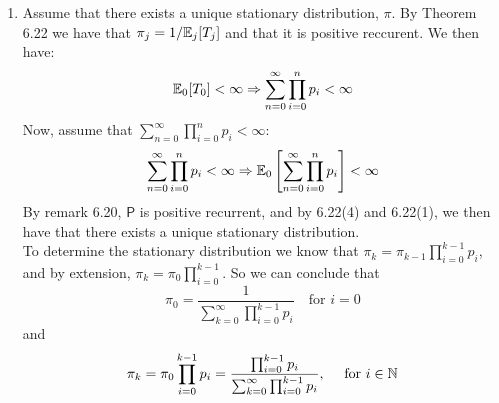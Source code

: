 \documentclass{Class}
\begin{document}
\begin{enumerate}
    \item 
    Assume that there exists a unique stationary distribution, $\pi$. By Theorem 6.22 we have that $\pi_j=1/\mathbb{E}_j[T_j]$ and that it is positive reccurent. We then have:
    $$\mathbb{E}_0[T_0]<\infty \Rightarrow \sum_{n=0}^{\infty}\prod_{i=0}^{n}p_i<\infty$$ 
    Now, assume that $\sum_{n=0}^{\infty}\prod_{i=0}^{n}p_i<\infty$:
    $$\sum_{n=0}^{\infty}\prod_{i=0}^{n}p_i<\infty\Rightarrow \mathbb{E}_0\left[\sum_{n=0}^{\infty}\prod_{i=0}^{n}p_i\right]<\infty$$
    By remark 6.20, $\mathsf{P}$ is positive recurrent, and by 6.22(4) and 6.22(1), we then have that there exists a unique stationary distribution.
    \\To determine the stationary distribution we know that $\pi_k=\pi_{k-1}\prod_{i=0}^{k-1}p_i$, and by extension, $\pi_k=\pi_0\prod_{i=0}^{k-1}$. So we can conclude that
    $$\pi_0 = \frac{1}{\sum_{k=0}^{\infty}\prod_{i=0}^{k-1}p_i}\quad\text{for }i=0$$ 
    and 
    $$\pi_k=\pi_0\prod_{i=0}^{k-1}p_i=\frac{\prod_{i=0}^{k-1}p_i}{\sum_{k=0}^{\infty}\prod_{i=0}^{k-1}p_i}, \quad \text{ for }i\in\mathbb{N}$$
\end{enumerate}
\end{document}
